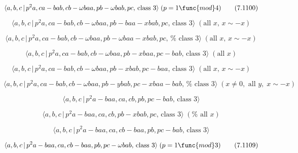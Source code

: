 \documentclass[10pt]{article}
\begin{document}
\begin{equation}
\langle a,b,c\,|\,p^{2}a,ca-bab,cb-\omega baa,pb-\omega bab,pc,\,\text{class 
}3\rangle \;(p=1\func{mod}4)  \tag{7.1100}
\end{equation}

\begin{equation}
\langle a,b,c\,|\,p^{2}a,ca-bab,cb-\omega baa,pb-baa-xbab,pc,\,\text{class }%
3\rangle \;(\text{all }x,\,x\sim -x)  \tag{7.1101}
\end{equation}

\begin{equation}
\langle a,b,c\,|\,p^{2}a,ca-bab,cb-\omega baa,pb-\omega baa-xbab,pc,\,\text{%
class }3\rangle \;(\text{all }x,\,x\sim -x)  \tag{7.1102}
\end{equation}

\begin{equation}
\langle a,b,c\,|\,p^{2}a,ca-bab,cb-\omega baa,pb-xbaa,pc-bab,\,\text{class }%
3\rangle \;(\text{all }x)  \tag{7.1103}
\end{equation}

\begin{equation}
\langle a,b,c\,|\,p^{2}a,ca-bab,cb-\omega baa,pb-xbab,pc-baa,\,\text{class }%
3\rangle \;(\text{all }x,\,x\sim -x)  \tag{7.1104}
\end{equation}

\begin{equation}
\langle a,b,c\,|\,p^{2}a,ca-bab,cb-\omega baa,pb-ybab,pc-xbaa-bab,\,\text{%
class }3\rangle \;(x\neq 0,\text{ all }y,\;x\sim -x)  \tag{7.1105}
\end{equation}

\begin{equation}
\langle a,b,c\,|\,p^2a-baa,ca,cb,pb,pc-bab,\,\text{class }3\rangle 
\tag{7.1106}
\end{equation}

\begin{equation}
\langle a,b,c\,|\,p^2a-baa,ca,cb,pb-xbab,pc,\,\text{class }3\rangle \;(\text{%
all }x)  \tag{7.1107}
\end{equation}

\begin{equation}
\langle a,b,c\,|\,p^2a-baa,ca,cb-baa,pb,pc-bab,\,\text{class }3\rangle 
\tag{7.1108}
\end{equation}

\begin{equation}
\langle a,b,c\,|\,p^{2}a-baa,ca,cb-baa,pb,pc-\omega bab,\,\text{class }%
3\rangle \;(p=1\func{mod}3)  \tag{7.1109}
\end{equation}
\end{document}
